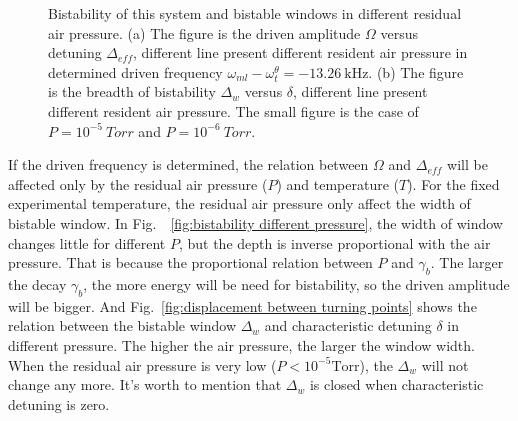 \documentclass[pra,aps,superscriptaddress,showpacs,preprint]{revtex4}%
\begin{document}
\begin{figure}
\centering
{}
 \caption{Bistability of this system and bistable windows in different residual air pressure. (a) The figure is the driven amplitude $\Omega$ versus detuning $\Delta_{eff}$, different line present different resident air pressure in determined driven frequency $\omega_{ml}-\omega_{t}^{\theta}=-13.26~\text{kHz}$. (b) The figure is the breadth of bistability $\Delta_{w}$ versus $\delta$, different line present different resident air pressure. The small figure is the case of $P=10^{-5}~Torr$ and $P=10^{-6}~Torr$.}
\label{fig:bistability air pressure}
\end{figure}

If the driven frequency is determined, the relation between $\Omega$ and $\Delta_{eff}$ will be affected only by the residual air pressure ($P$) and temperature ($T$). For the fixed experimental temperature, the residual air pressure only affect the width of bistable window. In Fig.~~\ref{fig:bistability different pressure}, the width of window changes little for different $P$, but the depth is inverse proportional with the air pressure. That is because the proportional relation between $P$ and $\gamma_{b}$. The larger the decay $\gamma_{b}$, the more energy will be need for bistability, so the driven amplitude will be bigger. And  Fig.~\ref{fig:displacement between turning points} shows the relation between the bistable window $\Delta_{w}$ and characteristic detuning $\delta$ in different pressure. The higher the air pressure, the larger the  window width. When the residual air pressure is very low
($P<10^{-5}\text{Torr}$), the $\Delta_{w}$ will not change any more. It's worth to mention that $\Delta_{w}$ is closed when characteristic detuning is zero.
\end{document}
